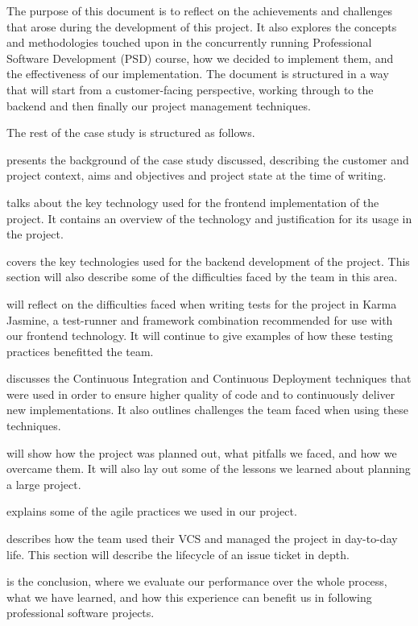 \documentclass{l3proj}
\begin{document}
The purpose of this document is to reflect on the achievements and challenges
 that arose during the development of this project. It also explores the concepts
 and methodologies touched upon in the concurrently running Professional Software
 Development (PSD) course, how we decided to implement them, and the effectiveness
 of our implementation. The document is structured in a way that will start from
 a customer-facing perspective, working through to the backend and then finally
 our project management techniques.

The rest of the case study is structured as follows.

 presents the background of the case study
 discussed, describing the customer and project context, aims and
 objectives and project state at the time of writing.

 talks about the key technology used for the
 frontend implementation of the project. It contains an overview of the
 technology and justification for its usage in the project.

 covers the key technologies used for the
 backend development of the project. This section will also describe
 some of the difficulties faced by the team in this area.

 will reflect on the difficulties faced when
 writing tests for the project in Karma Jasmine, a test-runner and framework
 combination recommended for use with our frontend technology. It will continue
 to give examples of how these testing practices benefitted the team.

 discusses the Continuous Integration and Continuous
 Deployment techniques that were used in order to ensure higher quality
 of code and to continuously deliver new implementations. It also outlines
 challenges the team faced when using these techniques.

 will show how the project was planned out,
 what pitfalls we faced, and how we overcame them. It will also lay out
 some of the lessons we learned about planning a large project.

 explains some of the agile practices we used in our 
 project.

 describes how the team used their VCS and managed the 
 project in day-to-day life. This section will describe the lifecycle of an issue ticket in
 depth.

 is the conclusion, where we evaluate our 
 performance over the whole process, what we have learned, and how 
 this experience can benefit us in following professional software projects.
\end{document}
